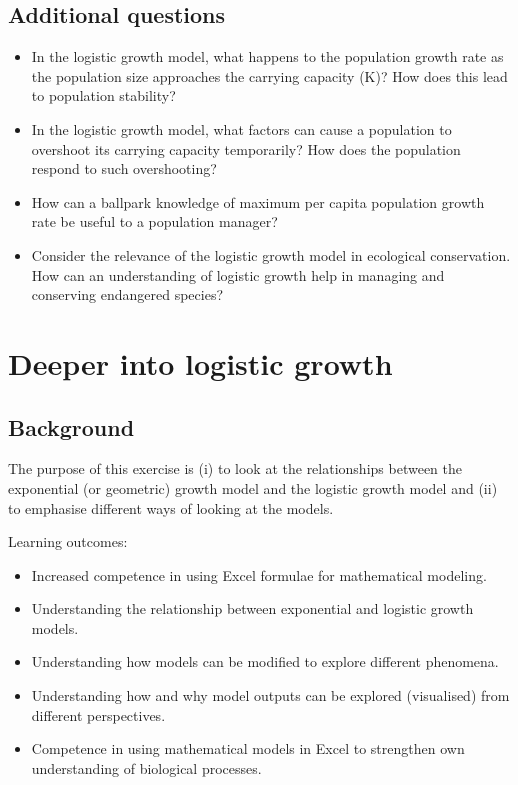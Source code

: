 \documentclass[
  a4paper]{book}
\providecommand{\tightlist}{%
  \setlength{\itemsep}{0pt}\setlength{\parskip}{0pt}}
\begin{document}
\hypertarget{additional-questions}{%
\section{Additional questions}\label{additional-questions}}

\begin{itemize}
\tightlist
\item
  In the logistic growth model, what happens to the population growth rate as the population size approaches the carrying capacity (K)? How does this lead to population stability?
\item
  In the logistic growth model, what factors can cause a population to overshoot its carrying capacity temporarily? How does the population respond to such overshooting?
\item
  How can a ballpark knowledge of maximum per capita population growth rate be useful to a population manager?
\item
  Consider the relevance of the logistic growth model in ecological conservation. How can an understanding of logistic growth help in managing and conserving endangered species?
\end{itemize}

\hypertarget{deeper-into-logistic-growth}{%
\chapter{Deeper into logistic growth}\label{deeper-into-logistic-growth}}

\hypertarget{background-4}{%
\section{Background}\label{background-4}}

The purpose of this exercise is (i) to look at the relationships between the exponential (or geometric) growth model and the logistic growth model and (ii) to emphasise different ways of looking at the models.

\begin{do-something}
Learning outcomes:

\begin{itemize}
\tightlist
\item
  Increased competence in using Excel formulae for mathematical
  modeling.
\item
  Understanding the relationship between exponential and logistic growth
  models.
\item
  Understanding how models can be modified to explore different
  phenomena.
\item
  Understanding how and why model outputs can be explored (visualised)
  from different perspectives.
\item
  Competence in using mathematical models in Excel to strengthen own
  understanding of biological processes.
\end{itemize}
\end{do-something}
\end{document}
